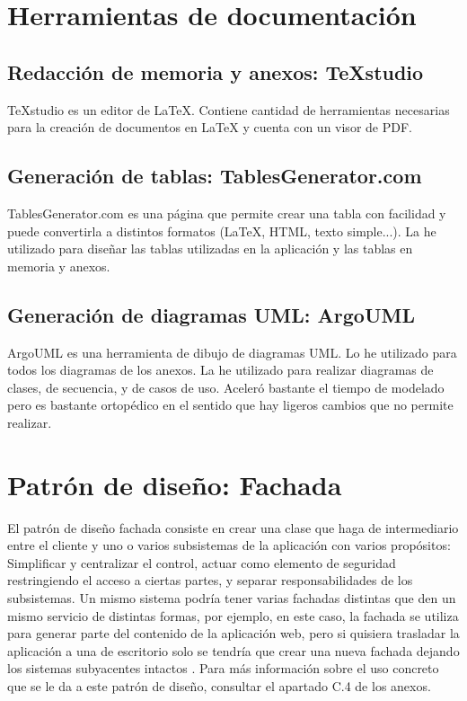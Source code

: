 \section{Herramientas de documentación}
\subsection{Redacción de memoria y anexos: TeXstudio}
TeXstudio es un editor de LaTeX. Contiene cantidad de herramientas necesarias para la creación de documentos en LaTeX y cuenta con un visor de PDF.
\subsection{Generación de tablas: TablesGenerator.com}
TablesGenerator.com es una página que permite crear una tabla con facilidad y puede convertirla a distintos formatos (LaTeX, HTML, texto simple...). La he utilizado para diseñar las tablas utilizadas en la aplicación y las tablas en memoria y anexos.
\subsection{Generación de diagramas UML: ArgoUML}
ArgoUML es una herramienta de dibujo de diagramas UML. Lo he utilizado para todos los diagramas de los anexos. La he utilizado para realizar diagramas de clases, de secuencia, y de casos de uso. Aceleró bastante el tiempo de modelado pero es bastante ortopédico en el sentido que hay ligeros cambios que no permite realizar.

\section{Patrón de diseño: Fachada}
El patrón de diseño fachada consiste en crear una clase que haga de intermediario entre el cliente y uno o varios subsistemas de la aplicación con varios propósitos: Simplificar y centralizar el control, actuar como elemento de seguridad restringiendo el acceso a ciertas partes, y separar responsabilidades de los subsistemas. Un mismo sistema podría tener varias fachadas distintas que den un mismo servicio de distintas formas, por ejemplo, en este caso, la fachada se utiliza para generar parte del contenido de la aplicación web, pero si quisiera trasladar la aplicación a una de escritorio solo se tendría que crear una nueva fachada dejando los sistemas subyacentes intactos \cite{gamma1995design}. Para más información sobre el uso concreto que se le da a este patrón de diseño, consultar el apartado C.4 de los anexos.
 
